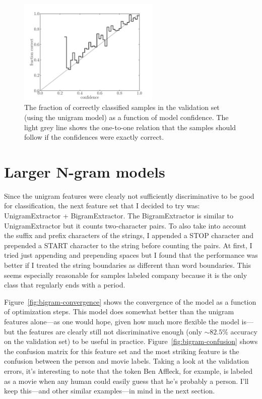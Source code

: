 \documentclass[11pt]{article}
\newcommand{\Fig}[1]{Figure~\ref{fig:#1}}
\newcommand{\figlabel}[1]{\label{fig:#1}}
\newcommand{\code}[1]{{\sffamily #1}}
\begin{document}
\begin{figure}[htbp]
\begin{center}
    \includegraphics[width=0.6\textwidth]{unigram_confidence_scale.pdf}
\end{center}
\caption{%
The fraction of correctly classified samples in the validation set (using the
unigram model) as a function of model confidence.
The light grey line shows the one-to-one relation that the samples should
follow if the confidences were exactly correct.
\figlabel{unigram-confidence-scale}}
\end{figure}

\clearpage

\section{Larger N-gram models}

Since the unigram features were clearly not sufficiently discriminative to be
good for classification, the next feature set that I decided to try was:
\code{UnigramExtractor + BigramExtractor}.
The \code{BigramExtractor} is similar to \code{UnigramExtractor} but it counts
two-character pairs.
To also take into account the suffix and prefix characters of the strings, I
appended a \code{STOP} character and prepended a \code{START} character to the
string before counting the pairs.
At first, I tried just appending and prepending spaces but I found that the
performance was better if I treated the string boundaries as different than
word boundaries.
This seems especially reasonable for samples labeled \code{company} because
it is the only class that regularly ends with a period.

\Fig{bigram-convergence} shows the convergence of the model as a function of
optimization steps.
This model does somewhat better than the unigram features alone---as one would
hope, given how much more flexible the model is---but the features are clearly
still not discriminative enough (only $\sim 82.5\%$ accuracy on the validation
set) to be useful in practice.
\Fig{bigram-confusion} shows the confusion matrix for this feature set and the
most striking feature is the confusion between the \code{person} and
\code{movie} labels.
Taking a look at the validation errors, it's interesting to note that the
token \code{Ben Affleck}, for example, is labeled as a \code{movie} when any
human could easily guess that he's probably a \code{person}.
I'll keep this---and other similar examples---in mind in the next section.
\end{document}
